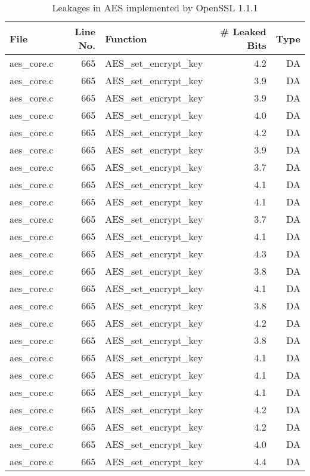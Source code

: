 \begin{table}[!ht]
\centering\tiny\scriptsize
\renewcommand{\baselinestretch}{0.96}\selectfont
\caption{Leakages in AES implemented by OpenSSL 1.1.1}\label{tab:AESOpenSSL1.1.1}
\begin{tabular}{lrlrr}
\hline
\textbf{File} & \textbf{Line No.} & \textbf{Function} & \textbf{\# Leaked Bits} & \textbf{Type} \\\hline
aes\_core.c& 665&AES\_set\_encrypt\_key&4.2 &DA\\
aes\_core.c& 665&AES\_set\_encrypt\_key&3.9 &DA\\
aes\_core.c& 665&AES\_set\_encrypt\_key&3.9 &DA\\
aes\_core.c& 665&AES\_set\_encrypt\_key&4.0 &DA\\
aes\_core.c& 665&AES\_set\_encrypt\_key&4.2 &DA\\
aes\_core.c& 665&AES\_set\_encrypt\_key&3.9 &DA\\
aes\_core.c& 665&AES\_set\_encrypt\_key&3.7 &DA\\
aes\_core.c& 665&AES\_set\_encrypt\_key&4.1 &DA\\
aes\_core.c& 665&AES\_set\_encrypt\_key&4.1 &DA\\
aes\_core.c& 665&AES\_set\_encrypt\_key&3.7 &DA\\
aes\_core.c& 665&AES\_set\_encrypt\_key&4.1 &DA\\
aes\_core.c& 665&AES\_set\_encrypt\_key&4.3 &DA\\
aes\_core.c& 665&AES\_set\_encrypt\_key&3.8 &DA\\
aes\_core.c& 665&AES\_set\_encrypt\_key&4.1 &DA\\
aes\_core.c& 665&AES\_set\_encrypt\_key&3.8 &DA\\
aes\_core.c& 665&AES\_set\_encrypt\_key&4.2 &DA\\
aes\_core.c& 665&AES\_set\_encrypt\_key&3.8 &DA\\
aes\_core.c& 665&AES\_set\_encrypt\_key&4.1 &DA\\
aes\_core.c& 665&AES\_set\_encrypt\_key&4.1 &DA\\
aes\_core.c& 665&AES\_set\_encrypt\_key&4.1 &DA\\
aes\_core.c& 665&AES\_set\_encrypt\_key&4.2 &DA\\
aes\_core.c& 665&AES\_set\_encrypt\_key&4.2 &DA\\
aes\_core.c& 665&AES\_set\_encrypt\_key&4.0 &DA\\
aes\_core.c& 665&AES\_set\_encrypt\_key&4.4 &DA\\

\end{tabular}
\end{table}

